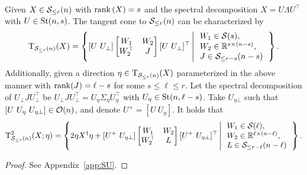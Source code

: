 \begin{proposition}\label{pro:tangenttoS}
    Given $X\in\mathcal{S}_{\le r}(n)$ with $\operatorname{rank}{(X)}=s$ and the spectral decomposition $X=U\varLambda U^\top$ with $U\in\mathrm{St}(n,s)$. The tangent cone to $\mathcal{S}_{\le r}(n)$ can be characterized by
    \begin{equation}\label{eq:tangent_Sr}
        \mathrm{T}_{\mathcal{S}_{\le r}(n)}(X)=\left\{ {[U\ U_{\bot}]\left[ \begin{matrix}
        	W_1&		W_2\\
        	W_2^\top&		J\\
        \end{matrix} \right][U\ U_{\bot}]^\top \left|\,\begin{array}{l}
        W_1\in\mathcal{S}(s),
        \\
        W_2\in\mathbb{R}^{s\times (n-s)},
        \\
        J\in\mathcal{S}_{\le r-s}(n-s)
        \end{array}\right.
        } \right\}.
    \end{equation}
    Additionally, given a direction $\eta\in\mathrm{T}_{\mathcal{S}_{\le r}(n)}(X)$ parameterized in the above manner with $\operatorname{rank}(J)=\ell-s$ for some $s\le\ell\le r$. Let the spectral decomposition of $U_\bot J U^\top_\bot$ be $U_\bot J U^\top_\bot=U_{\eta} \varSigma_\eta U_{\eta}^\top$ with $U_{\eta}\in\mathrm{St}(n,\ell-s)$. Take ${U}_{\eta\bot}$ such that $[U\ U_\eta\ U_{\eta\bot}]\in\orth(n)$, and denote $U^+=[U\ U_{\eta}]$. It holds that
    \begin{equation}\label{eq:tangenttwo_Sr}
        \mathrm{T}^2_{\mathcal{S}_{\le r}(n)}(X;\eta)=\left\{ {2\eta X^\dagger\eta + [U^+\ U_{\eta\bot}]\left[ \begin{matrix}
        	W_1&		W_2\\
        	W_2^\top&		L\\
        \end{matrix} \right][U^+\ U_{\eta\bot}]^\top \left|\,\begin{array}{l}
        W_1\in\mathcal{S}(\ell),
        \\
        W_2\in\mathbb{R}^{\ell\times (n-\ell)},
        \\
        L\in\mathcal{S}_{\le r-\ell}(n-\ell)
        \end{array}\right.
        } \right\}.
    \end{equation}
\end{proposition}
\begin{proof}
    See Appendix~\ref{app:SU}.
\end{proof}

